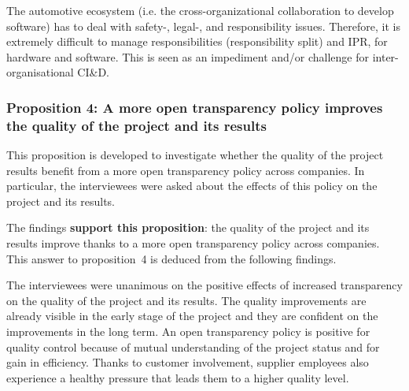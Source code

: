  The automotive %
ecosystem %
{(i.e. the cross-organizational collaboration to develop software)} has to deal with safety-, legal-, and responsibility issues. Therefore, it is extremely difficult to manage responsibilities (responsibility split) and IPR, for hardware and software. This is seen as an impediment and/or challenge for inter-organisational CI\&D.

\subsubsection{Proposition 4: A more open transparency policy improves the quality of the project and its results}

%
%
%

This proposition is developed to investigate whether the quality of the project results benefit from a more open transparency policy across companies. In particular, the interviewees were asked about the effects of this policy on the project and its results.

The findings {\bf support this proposition}:  the quality of the project and its results improve thanks to a more open transparency policy across companies. This answer to proposition~4 is deduced from the following findings.

 The interviewees were unanimous on the positive effects of increased transparency on the quality of the project and its results. The quality improvements are already visible in the early stage of the project and they are confident on the improvements in the long term. An open transparency policy is positive for quality control because of mutual understanding of the project status and for gain in efficiency. Thanks to customer involvement, supplier employees also experience a healthy pressure that leads them to a higher quality level.

